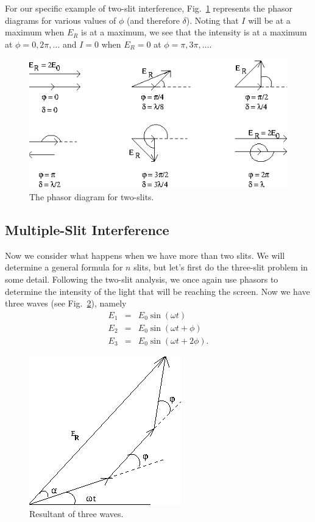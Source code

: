 For our specific example of two-slit interference,
Fig.~\ref{fig:diff:phasors_2slit} represents the phasor 
diagrams for various values of $\phi$ (and therefore $\delta$).  
Noting that $I$ will be at a maximum when $E_R$ is at a maximum,
we see that the intensity is at a maximum at $\phi = 0,2\pi,\dots$ and 
$I = 0$ when $E_R=0$ at $\phi = \pi,3\pi,\dots $.
\pagebreak  
\begin{figure}[htb]
\centering 
\epsfxsize=12cm \includegraphics[scale=0.6]{10_diffraction/phasors_2slit.eps}
\caption{The phasor diagram for two-slits.}
\label{fig:diff:phasors_2slit}
\end{figure}
 
\subsection{Multiple-Slit Interference}

Now we consider what happens when we have more than two slits.
We will determine a general formula for $n$ slits, but let's first
do the three-slit problem in some detail.  Following the two-slit
analysis, we once again use phasors to determine the intensity
of the light that will be reaching the screen. 
Now we have three waves (see Fig.~\ref{fig:diff:3E}), namely
\begin{eqnarray}
E_1 & = & E_0 \sin( \omega t) \\
E_2 & = & E_0 \sin( \omega t+ \phi) \\
E_3 & = & E_0 \sin( \omega t + 2 \phi). 
\end{eqnarray}
\pagebreak
\begin{figure}[htb]
\centering 
\epsfxsize=4cm \includegraphics[scale=0.6]{10_diffraction/3E.eps}
\caption{Resultant of three waves.}
\label{fig:diff:3E}
\end{figure}

